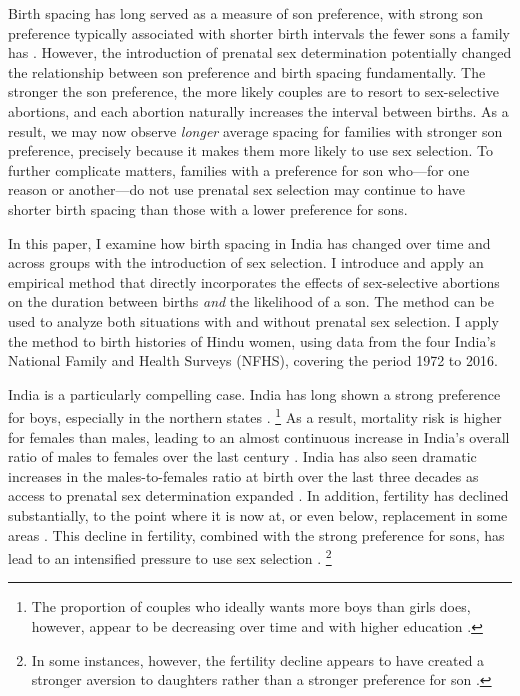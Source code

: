 Birth spacing has long served as a measure of son preference, with strong
son preference typically associated with shorter birth intervals the
fewer sons a family has \citep{ben-porath76b,Leung1988}.
However, the introduction of prenatal sex determination potentially  
changed the relationship between son preference and birth spacing fundamentally.
The stronger the son preference, the more likely couples are to resort to sex-selective 
abortions, and each abortion naturally increases the interval between births.
As a result, we may now observe \emph{longer} average spacing for families with stronger 
son preference, precisely because it makes them more likely to use sex selection.
To further complicate matters, families with a preference for son who---for one reason or 
another---do not use prenatal sex selection may continue to have shorter birth spacing 
than those with a lower preference for sons.

In this paper, I examine how birth spacing in India has changed over time and across 
groups with the introduction of sex selection.
I introduce and apply an empirical method that directly incorporates the effects of 
sex-selective abortions on the duration between births 
\emph{and} 
the likelihood of a son. 
The method can be used to analyze both situations with and without prenatal
sex selection.
I apply the method to birth histories of Hindu women, using data from the four
India's National Family and Health Surveys (NFHS), covering the period 
1972 to 2016. 

India is a particularly compelling case.
India has long shown a strong preference for boys, especially in the northern 
states \citep{Kishor1993,murthi95,arnold98}.%
\footnote{
The proportion of couples who ideally wants more boys than girls does, however,
appear to be decreasing over time and with higher education \citep{bhat03,pande07}.
}
As a result, mortality risk is higher for females than males, leading to an almost
continuous increase in India's overall ratio of males to females over the last century 
\citep{dyson01,Navaneetham2011,Bongaarts2015}.
India has also seen dramatic increases in the males-to-females ratio  
at birth over the last three decades as access to prenatal sex determination 
expanded \citep{das_gupta97,Sudha1999,Arnold2002,retherford03b,jha06,Guilmoto2012}.
In addition, fertility has declined substantially, to the point where it is now
at, or even below, replacement in some areas 
\citep{Guilmoto2013,Dharmalingam2014,International-Institute-for-Population-Sciences-IIPS2017}.
This decline in fertility, combined with the strong preference for sons, has lead to an 
intensified pressure to use sex selection \citet{Guilmoto2009a,Bongaarts2013,Jayachandran2017}.%
\footnote{
In some instances, however, the fertility decline appears to have created a stronger 
aversion to daughters rather than a stronger preference for son \citet{DiamondSmith2008}.
}
 
